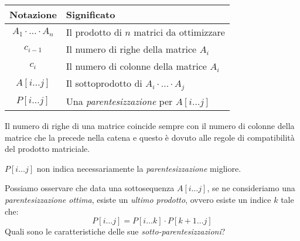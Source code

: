 \begin{table}[h!]
    \centering
    \renewcommand{\arraystretch}{1.2}
    \begin{tabular}{|c|l|}
        \hline
        \textbf{Notazione} & \textbf{Significato}\\
        \hline
        $A_1\cdot\ldots\cdot A_n$ & Il prodotto di $n$ matrici da ottimizzare\\
        \hline
        $c_{i-1}$ & Il numero di righe della matrice $A_i$\\
        \hline
        $c_i$ & Il numero di colonne della matrice $A_i$\\
        \hline
        $A[i\dots j]$ & Il sottoprodotto di $A_i\cdot\ldots\cdot A_j$\\
        \hline
        $P[i\dots j]$ & Una \emph{parentesizzazione} per $A[i\dots j]$\\
        \hline
    \end{tabular}
\end{table}
\begin{note}
    Il numero di righe di una matrice coincide sempre con il numero di colonne
    della matrice che la precede nella catena e questo è dovuto alle regole di
    compatibilità del prodotto matriciale.
\end{note}
\begin{note}
    $P[i\dots j]$ non indica necessariamente la \emph{parentesizzazione}
    migliore.
\end{note}\noindent
Possiamo osservare che data una sottosequenza $A[i\dots j]$, se ne consideriamo
una \emph{parentesizzazione ottima}, esiste un \emph{ultimo prodotto}, ovvero
esiste un indice $k$ tale che:
\[P[i\dots j]=P[i\dots k]\cdot P[k+1\dots j]\]
Quali sono le caratteristiche delle sue \emph{sotto-parentesizzazioni}?


